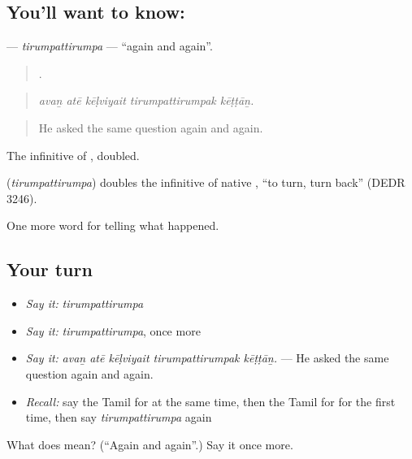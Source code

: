 \subsection*{You'll want to know: }
\textbf{} — \emph{tirumpattirumpa} — \textquotedblleft{}again and again\textquotedblright{}.

\begin{quote}
    .
\end{quote}

\begin{quote}
\emph{avaṉ atē kēḷviyait tirumpattirumpak kēṭṭāṉ.}
\end{quote}

\begin{quote}
He asked the same question again and again.
\end{quote}

The infinitive of , doubled.

\begin{cousinweb}
\textbf{} (\emph{tirumpattirumpa}) doubles the infinitive of native , \textquotedblleft{}to turn, turn back\textquotedblright{} (DEDR 3246).
\end{cousinweb}

\begin{grammarlens}[title={What you've built}]
One more word for telling what happened.
\end{grammarlens}

\subsection*{Your turn}
\begin{itemize}
\raggedright
  \item \emph{Say it:} \emph{tirumpattirumpa}
  \item \emph{Say it:} \emph{tirumpattirumpa}, once more
  \item \emph{Say it:} \emph{avaṉ atē kēḷviyait tirumpattirumpak kēṭṭāṉ.} — He asked the same question again and again.
  \item \emph{Recall:} say the Tamil for at the same time, then the Tamil for for the first time, then say \emph{tirumpattirumpa} again
\end{itemize}

\begin{tcolorbox}[breakable,colback=teal!4,colframe=teal!35!black,title={Before you move on}]
What does  mean? (\textquotedblleft{}Again and again\textquotedblright{}.) Say it once more.
\end{tcolorbox}
